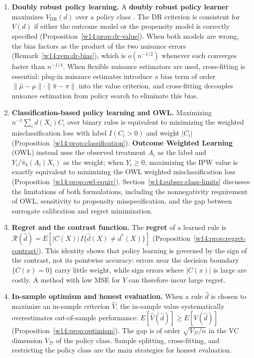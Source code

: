 \documentclass[master.tex]{subfiles}
\begin{document}
\begin{enumerate}
  \item \textbf{Doubly robust policy learning.}
    A \textbf{doubly robust policy learner} maximizes $\widehat V_{\mathrm{DR}}(d)$
    over a policy class \citep{dudik2014doubly}.  The DR criterion is
    consistent for $V(d)$ if either the outcome model or the propensity model
    is correctly specified (Proposition~\ref{w14:prop:dr-value}).  When both
    models are wrong, the bias factors as the product of the two nuisance
    errors (Remark~\ref{w14:rem:dr-bias}), which is $o(n^{-1/2})$ whenever
    each converges faster than $n^{-1/4}$.  When flexible nuisance estimators
    are used, cross-fitting is essential: plug-in nuisance estimates introduce
    a bias term of order $\|\hat\mu-\mu\|\cdot\|\hat\pi-\pi\|$ into the value
    criterion, and cross-fitting decouples nuisance estimation from policy
    search to eliminate this bias.

  \item \textbf{Classification-based policy learning and OWL.}
    Maximizing $n^{-1}\sum_i d(X_i)C_i$ over binary rules is equivalent to
    minimizing the weighted misclassification loss with label $I(C_i>0)$ and
    weight $|C_i|$ (Proposition~\ref{w14:prop:classification}).
    \textbf{Outcome Weighted Learning} (OWL) \citep{zhao2012estimating}
    instead uses the observed treatment $A_i$ as the label and
    $Y_i/\hat\pi_b(A_i\mid X_i)$ as the weight; when $Y_i\geq 0$,
    maximizing the IPW value is exactly equivalent to minimizing the OWL
    weighted misclassification loss (Proposition~\ref{w14:prop:owl-equiv}).
    Section~\ref{w14:subsec:class-limits} discusses the limitations of both
    formulations, including the nonnegativity requirement of OWL, sensitivity
    to propensity misspecification, and the gap between surrogate calibration
    and regret minimization.

  \item \textbf{Regret and the contrast function.}
    The \textbf{regret} of a learned rule is
    $\mathcal R(\hat d)=E[|C(X)|\,I\{\hat d(X)\neq d^\ast(X)\}]$
    (Proposition~\ref{w14:prop:regret-contrast}).  This identity shows
    that policy learning is governed by the sign of the contrast, not its
    pointwise accuracy: errors near the decision boundary $\{C(x)=0\}$
    carry little weight, while sign errors where $|C(x)|$ is large are
    costly.  A method with low MSE for $Y$ can therefore incur large regret.

  \item \textbf{In-sample optimism and honest evaluation.}
    When a rule $\hat d$ is chosen to maximize an in-sample criterion
    $\widehat V$, the in-sample value systematically overestimates out-of-sample
    performance: $E[\widehat V(\hat d)]\geq E[V(\hat d)]$
    (Proposition~\ref{w14:prop:optimism}).  The gap is of order
    $\sqrt{V_{\mathcal D}/n}$ in the VC dimension $V_{\mathcal D}$ of the
    policy class.  Sample splitting, cross-fitting, and restricting the policy
    class are the main strategies for honest evaluation.

\end{enumerate}
\end{document}
